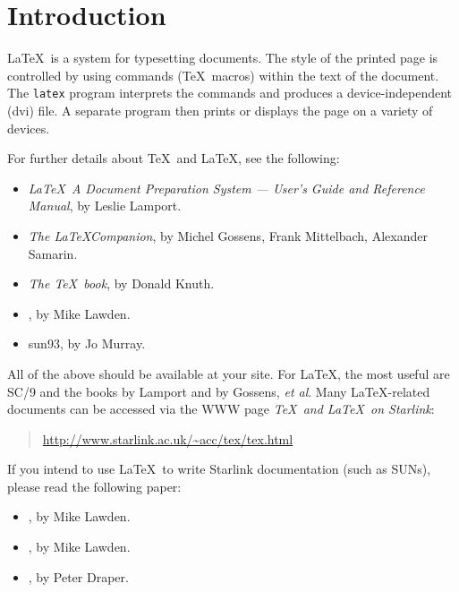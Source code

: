 \documentclass[11pt,twoside,nolof]{starlink}
\begin{document}
\scfrontmatter

\section{\label{introduction}Introduction}

\LaTeX\ is a system for typesetting documents.
The style of the printed page is
controlled by using commands (\TeX\ macros) within the text of the document.
The \texttt{latex} program interprets the commands and produces a
device-independent (dvi) file.
A separate program then prints or displays the page on a variety of devices.

For further details about \TeX\ and \LaTeX, see the following:

\begin{itemize}
  \item \emph{\LaTeX\ A Document Preparation System ---
        User's Guide and Reference Manual},
        by Leslie Lamport\cite{lamport}.
  \item \emph{The \LaTeX Companion},
        by Michel Gossens, Frank Mittelbach, Alexander Samarin\cite{latexcomp}.
  \item \emph{The \TeX\ book}, by Donald Knuth\cite{texbook}.
  \item {},
        by Mike Lawden\cite{sc9}.
  \item {}
        {sun93}{},
        by Jo Murray\cite{sun93}.
\end{itemize}

All of the above should be available at your site.
For \LaTeX, the most useful are SC/9
and the books by Lamport and by Gossens, \emph{et al}.
Many \LaTeX-related documents can be accessed via the WWW page
\emph{\TeX\ and \LaTeX\ on Starlink}:

\begin{quote}
   \url{http://www.starlink.ac.uk/~acc/tex/tex.html}
\end{quote}

If you intend to use \LaTeX\ to write Starlink documentation (such as SUNs),
please read the following paper:
\begin{itemize}
  \item {},
         by Mike Lawden\cite{sgp28}.
  \item {},
         by Mike Lawden\cite{sgp50}.
  \item {},
         by Peter Draper\cite{sun199}.
\end{itemize}
\end{document}

